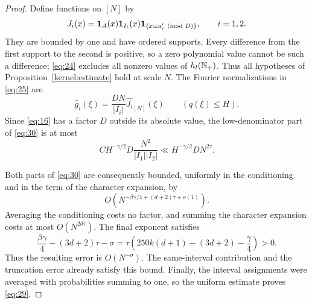\begin{proof}
Define functions on $[N]$ by
\[
 J_i(x)=\mathbf 1_A(x)\mathbf 1_{I_i}(x)
             \mathbf 1_{\{x\equiv a'_i\pmod D\}},\qquad i=1,2.
\]
They are bounded by one and have ordered supports.
Every difference from the first support to the second is positive,
so a zero polynomial value cannot be such a difference;
\eqref{eq:24} excludes all nonzero values of $h_l(\mathbb N_+)$.
Thus all hypotheses of Proposition~\ref{kernel:estimate} hold at scale
$N$.  The Fourier normalizations in \eqref{eq:25} are
\[
 \widehat g_i(\xi)
 =\frac{DN}{|I_i|}\widehat{J_i}_{[N]}(\xi)
 \qquad(q(\xi)\le H).
\]
Since \eqref{eq:16} has a factor $D$ outside its absolute value,
the low-denominator part of \eqref{eq:30} is at most
\[
 C H^{-\gamma/2}D\frac{N^2}{|I_1||I_2|}
 \ll H^{-\gamma/2}D N^{2\tau}.
\]

Both parts of \eqref{eq:30} are consequently bounded, uniformly in the
conditioning and in the term of the character expansion, by
\[
 O\!\left(N^{-\beta\gamma/4+(d+2)\tau+o(1)}\right).
\]
Averaging the conditioning costs no factor, and summing the character
expansion costs at most $O(N^{2d\tau})$.
The final exponent satisfies
\[
 \frac{\beta\gamma}{4}-(3d+2)\tau-\sigma
 =\tau\left(250k(d+1)-(3d+2)-\frac\gamma4\right)>0.
\]
Thus the resulting error is $O(N^{-\sigma})$.
The same-interval contribution and the truncation error already satisfy
this bound.  Finally, the interval assignments were averaged with
probabilities summing to one, so the uniform estimate proves
\eqref{eq:29}.
\end{proof}
